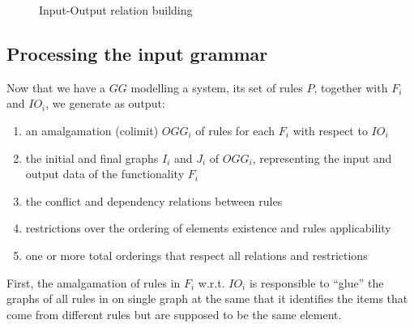 \begin{example}
\begin{figure}[!ht]
  \centering
  \caption{Input-Output relation building}\label{fig:tests:inout}
\end{figure}

\end{example}

\subsection{Processing the input grammar}


Now that we have a $GG$ modelling a system, its set of rules $P$, together with $F_i$ and $IO_i$, we generate as output:

\begin{enumerate}
\item an amalgamation (colimit) $OGG_i$ of rules for each $F_i$ with respect to $IO_i$
\item the initial and final graphs $I_i$ and $J_i$ of $OGG_i$, representing the input and output data of the functionality $F_i$
\item the conflict and dependency relations between rules
\item restrictions over the ordering of elements existence and rules applicability
\item one or more total orderings that respect all relations and restrictions
\end{enumerate}

First, the amalgamation of rules in $F_i$ w.r.t. $IO_i$ is responsible to ``glue'' the graphs of all rules in on single graph at the same that it identifies the items that come from different rules but are supposed to be the same element.

